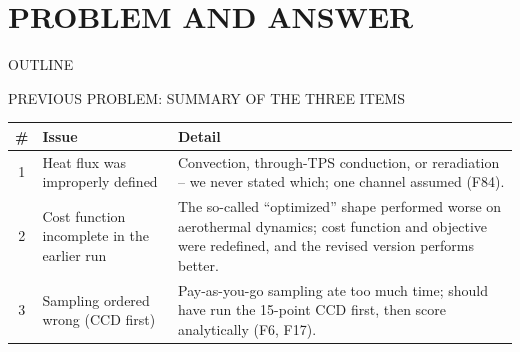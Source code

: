 \documentclass[aspectratio=169,11pt]{beamer}
\begin{document}
{
\begin{frame}[plain]
  \ITBTitleBackground   %
  \titlepage
\end{frame}   %
}

\section{PROBLEM AND ANSWER}
\begin{frame}{OUTLINE}              %
  \scriptsize\linespread{0.85}\selectfont
  \tableofcontents[hideallsubsections]
\end{frame}

\begin{frame}{PREVIOUS PROBLEM: SUMMARY OF THE THREE ITEMS}   %
  \small
  \begin{tabular}{@{}c@{\,~}p{5.5cm}@{\,~}p{5.5cm}@{}}
    \textbf{\#} & \textbf{Issue} & \textbf{Detail} \\
    \hline
    1 & Heat flux was improperly defined &
    Convection, through-TPS conduction, or reradiation -- we never stated which; one channel assumed (F84). \\ \hline
    2 & Cost function incomplete in the earlier run &
    The so-called ``optimized'' shape performed worse on aerothermal dynamics; cost function and objective were redefined, and the revised version performs better. \\ \hline
    3 & Sampling ordered wrong (CCD first) &
    Pay-as-you-go sampling ate too much time; should have run the 15-point CCD first, then score analytically (F6, F17). \\
  \end{tabular}
  \vspace{0.4cm}
\end{frame}
\end{document}
